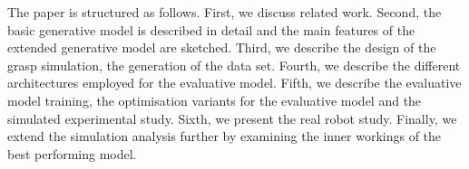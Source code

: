 The paper is structured as follows. First, we discuss related work. Second, the basic generative model is described in detail and the main features of the extended generative model are sketched. Third, we describe the design of the grasp simulation, the generation of the data set. Fourth, we describe the different architectures employed for the evaluative model. Fifth, we describe the evaluative model training, the optimisation variants for the evaluative model and the simulated experimental study. Sixth, we present the real robot study. Finally, we extend the simulation analysis further by examining the inner workings of the best performing model.
